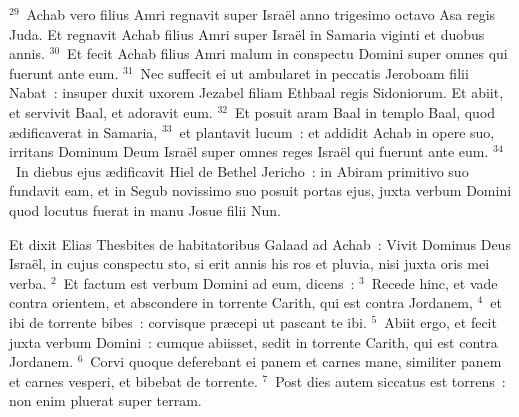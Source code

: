 ${}^{29}$~Achab vero filius Amri regnavit super Isra\"el anno trigesimo octavo Asa regis Juda. Et regnavit Achab filius Amri super Isra\"el in Samaria viginti et duobus annis.
${}^{30}$~Et fecit Achab filius Amri malum in conspectu Domini super omnes qui fuerunt ante eum.
${}^{31}$~Nec suffecit ei ut ambularet in peccatis Jeroboam filii Nabat~: insuper duxit uxorem Jezabel filiam Ethbaal regis Sidoniorum. Et abiit, et servivit Baal, et adoravit eum.
${}^{32}$~Et posuit aram Baal in templo Baal, quod \ae dificaverat in Samaria,
${}^{33}$~et plantavit lucum~: et addidit Achab in opere suo, irritans Dominum Deum Isra\"el super omnes reges Isra\"el qui fuerunt ante eum.
${}^{34}$~In diebus ejus \ae dificavit Hiel de Bethel Jericho~: in Abiram primitivo suo fundavit eam, et in Segub novissimo suo posuit portas ejus, juxta verbum Domini quod locutus fuerat in manu Josue filii Nun.

\lettrine[lines=10,image=true,loversize=0.05,lraise=-0.03]{E}{}t dixit Elias Thesbites de habitatoribus Galaad ad Achab~: Vivit Dominus Deus Isra\"el, in cujus conspectu sto, si erit annis his ros et pluvia, nisi juxta oris mei verba.
${}^{2}$~Et factum est verbum Domini ad eum, dicens~:
${}^{3}$~Recede hinc, et vade contra orientem, et abscondere in torrente Carith, qui est contra Jordanem,
${}^{4}$~et ibi de torrente bibes~: corvisque pr\ae cepi ut pascant te ibi.
${}^{5}$~Abiit ergo, et fecit juxta verbum Domini~: cumque abiisset, sedit in torrente Carith, qui est contra Jordanem.
${}^{6}$~Corvi quoque deferebant ei panem et carnes mane, similiter panem et carnes vesperi, et bibebat de torrente.
${}^{7}$~Post dies autem siccatus est torrens~: non enim pluerat super terram.


